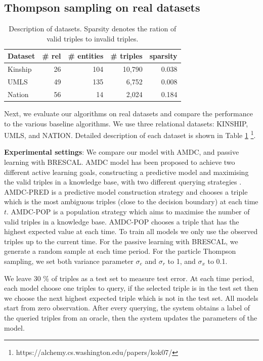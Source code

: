\subsection{Thompson sampling on real datasets}
\begin{table}[t]
\centering
\caption{\label{tbl:dataset}Description of datasets. 
Sparsity denotes the ration of valid triples to invalid triples.}
\begin{tabular}{l | r | r | r | r}
Dataset &  \# rel & \# entities & \# triples & sparsity \\ \hline
Kinship & 26 & 104  & 10,790 & 0.038 \\
UMLS & 49 &135  & 6,752 & 0.008 \\
Nation & 56 & 14  & 2,024 & 0.184 \\
\end{tabular}
\end{table}

Next, we evaluate our algorithms on real datasets and compare the performance to the various baseline 
algorithms. We use three relational datasets: KINSHIP, UMLS, and NATION. Detailed description of each 
dataset is shown in Table \ref{tbl:dataset} \footnote{https://alchemy.cs.washington.edu/papers/kok07/}.

\textbf{Experimental settings}: 
We compare our model with AMDC, and passive learning with BRESCAL.  
AMDC model has been proposed to achieve two different active learning goals, constructing a predictive
model and maximising the valid triples in a knowledge base, with two different querying strategies
 \cite{kajino2015active}. 
AMDC-PRED is a predictive model construction strategy and chooses a triple which is the most ambiguous triples (close to the decision boundary) at each time $t$.
AMDC-POP is a population strategy which aims to maximise the number of valid triples in a knowledge base. AMDC-POP chooses a triple that has the highest expected value at each time.  
To train all models we only use the observed triples up to the current time. For the passive learning with BRESCAL, we generate a random sample at each time period.
For the particle Thompson sampling, we set both variance parameter $\sigma_e$ and $\sigma_r$ to 1, and $
\sigma_x$ to 0.1. 

We leave 30 \% of triples as a test set to measure test error. 
At each time period, each model choose one triples to query, 
if the selected triple is in the test set then we choose the next highest expected triple which is not in the test set.
All models start from zero observation. 
After every querying, the system obtains a label of the queried triples from an oracle,
then the system updates the parameters of the model. 

